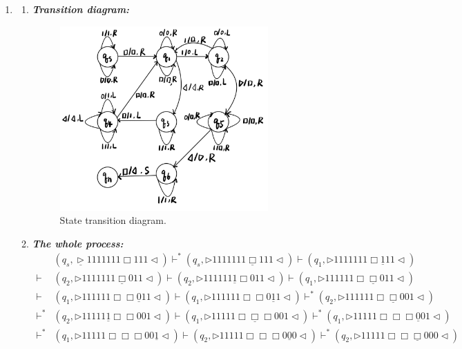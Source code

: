 \documentclass[12pt,a4paper]{article}
\makeatletter
\newtheorem*{solution}{Solution}
\theoremstyle{definition}
\renewenvironment{solution}[1][Solution] {\par\pushQED{\qed}\normalfont\topsep6\p@\@plus6\p@\relax\trivlist\item[\hskip\labelsep\bfseries#1\@addpunct{.}]\ignorespaces}{\popQED\endtrivlist\@endpefalse} \makeatother
\makeatother
\begin{document}
\begin{enumerate}
\begin{solution}
\begin{enumerate}
	\item \textbf{\textit{Transition diagram:}}
	\begin{figure}[!htbp]
	\centering
	\includegraphics[width=0.8\textwidth]{Fig-Graph.pdf}
	\caption{State transition diagram.}
	\label{Fig-diagram}
	\end{figure}
	\item \textbf{\textit{The whole process:}}
	\begin{align*}\nonumber
		&(q_s,\underline{\triangleright}1111111\Box 111\triangleleft)\vdash^* (q_s,\triangleright 1111111\underline{\Box} 111\triangleleft)
\vdash  (q_1,\triangleright 1111111\Box\underline{1} 11\triangleleft)\\
\vdash &(q_2,\triangleright 1111111\underline{\Box} 011\triangleleft)
\vdash 	(q_2,\triangleright 111111\underline{1}\Box 011\triangleleft)
\vdash  (q_1,\triangleright 111111\Box\underline{\Box} 011\triangleleft)\\
\vdash &(q_1,\triangleright 111111\Box\Box\underline{0} 11\triangleleft)
\vdash  (q_1,\triangleright 111111\Box\Box 0 \underline{1} 1\triangleleft)
\vdash^* (q_2,\triangleright 111111\Box\underline{\Box}00 1\triangleleft)\\
\vdash^* &(q_2,\triangleright 11111\underline{1}\Box\Box 00 1\triangleleft)
\vdash (q_1,\triangleright 11111\Box\underline{\Box}\Box 00 1\triangleleft)
\vdash^* (q_1,\triangleright 11111\Box\Box\Box \underline{0}0 1\triangleleft)\\
\vdash^*&(q_1,\triangleright 11111\Box\Box\Box 00 \underline{1}\triangleleft)
\vdash (q_2,\triangleright 11111\Box\Box\Box 0 \underline{0} 0\triangleleft)
\vdash^* (q_2,\triangleright 11111\Box\Box\underline{\Box} 000\triangleleft)\\

\end{align*}
\end{enumerate}
\end{solution}
\end{enumerate}
\end{document}
